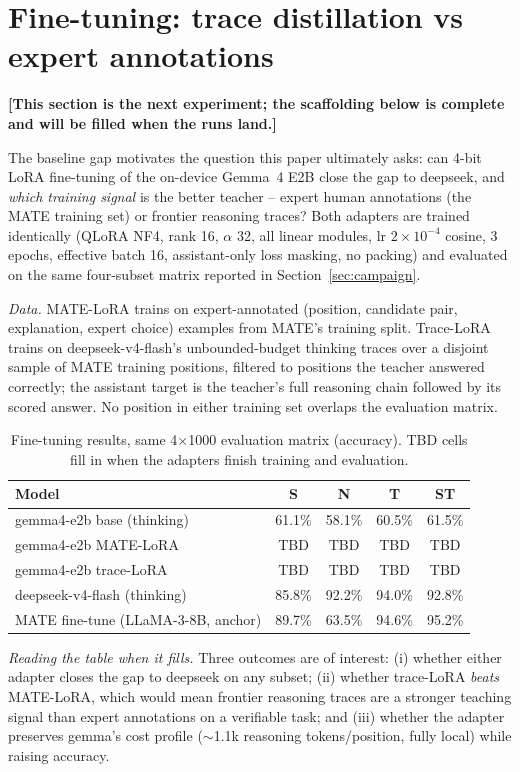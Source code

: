 \documentclass{article}
\begin{document}
\section{Fine-tuning: trace distillation vs expert annotations}
\label{sec:lora}
\textbf{[This section is the next experiment; the scaffolding below is
complete and will be filled when the runs land.]}

The baseline gap motivates the question this paper ultimately asks: can
4-bit LoRA fine-tuning of the on-device Gemma~4 E2B close the gap to
deepseek, and \emph{which training signal} is the better teacher --
expert human annotations (the MATE training set) or frontier reasoning
traces? Both adapters are trained identically (QLoRA NF4, rank 16,
$\alpha$ 32, all linear modules, lr $2\times10^{-4}$ cosine, 3 epochs,
effective batch 16, assistant-only loss masking, no packing) and
evaluated on the same four-subset matrix reported in
Section~\ref{sec:campaign}.

\emph{Data.} MATE-LoRA trains on expert-annotated (position, candidate
pair, explanation, expert choice) examples from MATE's training split.
Trace-LoRA trains on deepseek-v4-flash's unbounded-budget thinking
traces over a disjoint sample of MATE training positions, filtered to
positions the teacher answered correctly; the assistant target is the
teacher's full reasoning chain followed by its scored answer. No
position in either training set overlaps the evaluation matrix.

\begin{table}[h]
\centering
\small
\begin{tabular}{lcccc}
\hline
Model & S & N & T & ST \\ \hline
gemma4-e2b base (thinking) & 61.1\% & 58.1\% & 60.5\% & 61.5\% \\
gemma4-e2b MATE-LoRA & TBD & TBD & TBD & TBD \\
gemma4-e2b trace-LoRA & TBD & TBD & TBD & TBD \\
deepseek-v4-flash (thinking) & 85.8\% & 92.2\% & 94.0\% & 92.8\% \\
MATE fine-tune (LLaMA-3-8B, anchor) & 89.7\% & 63.5\% & 94.6\% & 95.2\% \\ \hline
\end{tabular}
\caption{Fine-tuning results, same 4$\times$1000 evaluation matrix
(accuracy). TBD cells fill in when the adapters finish training and
evaluation.}
\label{tab:lora}
\end{table}

\emph{Reading the table when it fills.} Three outcomes are of
interest: (i) whether either adapter closes the gap to deepseek on
any subset; (ii) whether trace-LoRA \emph{beats} MATE-LoRA, which
would mean frontier reasoning traces are a stronger teaching signal
than expert annotations on a verifiable task; and (iii) whether the
adapter preserves gemma's cost profile ($\sim$1.1k reasoning
tokens/position, fully local) while raising accuracy.
\end{document}
